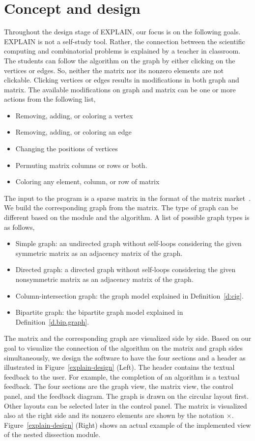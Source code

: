 \documentclass[12pt, twoside,a4paper,toc=bibliography]{scrbook}
\newcommand{\figref}[1]{Figure~\protect\ref{#1}}
\newcommand{\defref}[1]{Definition~\protect\ref{#1}}
\begin{document}
\section{Concept and design}
\label{s.concept}
Throughout the design stage of \mbox{EXPLAIN}, our focus is on the following goals.
\mbox{EXPLAIN} is not a self-study tool.
Rather, the connection between the scientific computing
and combinatorial problems is explained by a teacher in classroom.
The students can follow the algorithm on the graph by either
clicking on the vertices or edges.
So, neither the matrix nor its nonzero elements are not clickable.
Clicking vertices or edges results in modifications in both graph and matrix.
The available modifications on graph and matrix can be one or more actions
from the following list,
\begin{itemize}
\item Removing, adding, or coloring a vertex
\item Removing, adding, or coloring an edge
\item Changing the positions of vertices
\item Permuting matrix columns or rows or both.
\item Coloring any element, column, or row of matrix
\end{itemize}

The input to the program is a sparse matrix in the format of the matrix market~\cite{matrix-market}.
We build the corresponding graph from the matrix.
The type of graph can be different based on the module and the algorithm.
A list of possible graph types is as follows,
\begin{itemize}
\item Simple graph: an undirected graph without self-loops considering 
the given symmetric matrix as an adjacency matrix of the graph.
\item Directed graph: a directed graph without self-loops considering
the given nonsymmetric matrix as an adjacency matrix of the graph.
\item Column-intersection graph: the graph model explained in \defref{d:cig}.
\item Bipartite graph: the bipartite graph model explained in \defref{d.bip.graph}.
\end{itemize}
The matrix and the corresponding graph are visualized side by side.
Based on our goal to visualize the connection of the algorithm on the matrix and graph sides simultaneously,
we design the software to have the four sections and a header as illustrated in \figref{explain-design} (Left).
The header contains the textual feedback to the user. For example, the completion of an algorithm is a textual feedback. 
The four sections are the graph view, the matrix view, the control panel, and the feedback diagram.
The graph is drawn on the circular layout first. Other layouts can be selected later
in the control panel. The matrix is visualized also at the right side and
its nonzero elements are shown by the notation $\times$.
\figref{explain-design} (Right) shows an actual example of the implemented view of
the nested dissection module.
\end{document}
